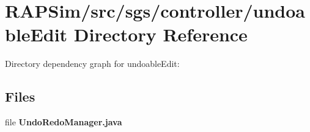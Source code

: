 \section{R\-A\-P\-Sim/src/sgs/controller/undoable\-Edit Directory Reference}
\label{dir_e560290bfc356acf130a897f402ed296}
Directory dependency graph for undoable\-Edit\-:
\subsection*{Files}
\begin{DoxyCompactItemize}
\item 
file {\bf Undo\-Redo\-Manager.\-java}
\end{DoxyCompactItemize}
